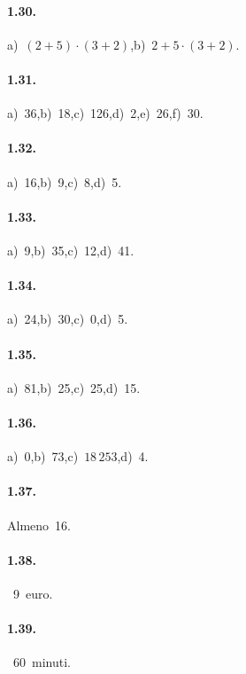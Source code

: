 \paragraph{1.30.}
a)~$ (2+5)\cdot(3+2) $,\quad b)~$ 2+5\cdot(3+2) $.

\paragraph{1.31.}
a)~36,\quad b)~18,\quad c)~126,\quad d)~2,\quad e)~26,\quad f)~30.

\begin{multicols}{2}
\paragraph{1.32.}
a)~16,\quad b)~9,\quad c)~8,\quad d)~5.

\paragraph{1.33.}
a)~9,\quad b)~35,\quad c)~12,\quad d)~41.

\paragraph{1.34.}
a)~24,\quad b)~30,\quad c)~0,\quad d)~5.

\paragraph{1.35.}
a)~81,\quad b)~25,\quad c)~25,\quad d)~15.

\paragraph{1.36.}
a)~0,\quad b)~73,\quad c)~$18\,253$,\quad d)~4.

\paragraph{1.37.}
Almeno~16.

\paragraph{1.38.}~9~euro.

\paragraph{1.39.}~60~minuti.
\end{multicols}
